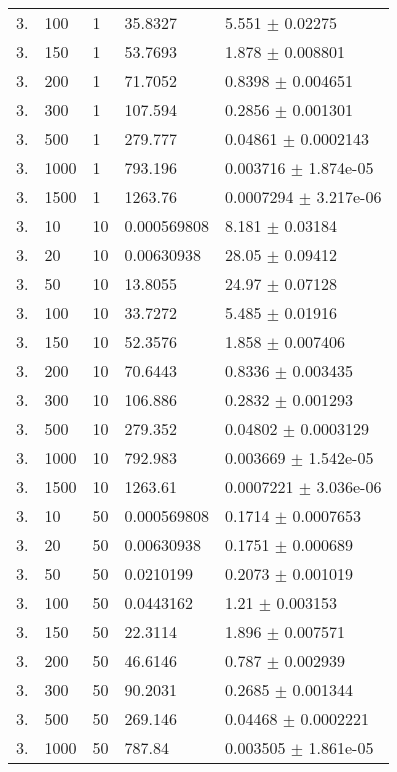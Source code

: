\begin{longtable}{lllll}
  3. &   100 &     1 &  35.8327 &    5.551 $\pm$  0.02275 \\
  3. &   150 &     1 &  53.7693 &    1.878 $\pm$ 0.008801 \\
  3. &   200 &     1 &  71.7052 &   0.8398 $\pm$ 0.004651 \\
  3. &   300 &     1 &  107.594 &   0.2856 $\pm$ 0.001301 \\
  3. &   500 &     1 &  279.777 &  0.04861 $\pm$ 0.0002143 \\
  3. &  1000 &     1 &  793.196 & 0.003716 $\pm$ 1.874e-05 \\
  3. &  1500 &     1 &  1263.76 & 0.0007294 $\pm$ 3.217e-06 \\
  3. &    10 &    10 & 0.000569808 &    8.181 $\pm$  0.03184 \\
  3. &    20 &    10 & 0.00630938 &    28.05 $\pm$  0.09412 \\
  3. &    50 &    10 &  13.8055 &    24.97 $\pm$  0.07128 \\
  3. &   100 &    10 &  33.7272 &    5.485 $\pm$  0.01916 \\
  3. &   150 &    10 &  52.3576 &    1.858 $\pm$ 0.007406 \\
  3. &   200 &    10 &  70.6443 &   0.8336 $\pm$ 0.003435 \\
  3. &   300 &    10 &  106.886 &   0.2832 $\pm$ 0.001293 \\
  3. &   500 &    10 &  279.352 &  0.04802 $\pm$ 0.0003129 \\
  3. &  1000 &    10 &  792.983 & 0.003669 $\pm$ 1.542e-05 \\
  3. &  1500 &    10 &  1263.61 & 0.0007221 $\pm$ 3.036e-06 \\
  3. &    10 &    50 & 0.000569808 &   0.1714 $\pm$ 0.0007653 \\
  3. &    20 &    50 & 0.00630938 &   0.1751 $\pm$ 0.000689 \\
  3. &    50 &    50 & 0.0210199 &   0.2073 $\pm$ 0.001019 \\
  3. &   100 &    50 & 0.0443162 &     1.21 $\pm$ 0.003153 \\
  3. &   150 &    50 &  22.3114 &    1.896 $\pm$ 0.007571 \\
  3. &   200 &    50 &  46.6146 &    0.787 $\pm$ 0.002939 \\
  3. &   300 &    50 &  90.2031 &   0.2685 $\pm$ 0.001344 \\
  3. &   500 &    50 &  269.146 &  0.04468 $\pm$ 0.0002221 \\
  3. &  1000 &    50 &   787.84 & 0.003505 $\pm$ 1.861e-05 \\

\end{longtable}
